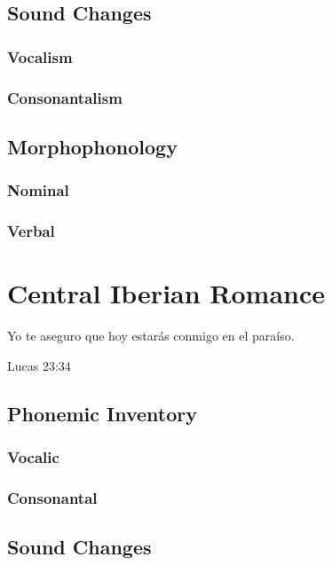 \documentclass{report}
\begin{document}
\section{Sound Changes}

\subsection{Vocalism}

\subsection{Consonantalism}

\section{Morphophonology}

\subsection{Nominal}

\subsection{Verbal}

\chapter{Central Iberian Romance}

\epigraph{Yo te aseguro que hoy estarás conmigo en el paraíso.}{Lucas 23:34}

\section{Phonemic Inventory}

\subsection{Vocalic}

\subsection{Consonantal}

\section{Sound Changes}
\end{document}
